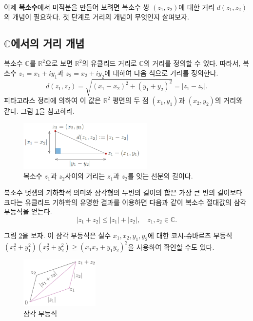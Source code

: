 이제 {\bf 복소수}에서 미적분을 만들어 보려면
복소수 쌍 $(z_1, z_2)$에 대한 거리 $d(z_1, z_2)$의 개념이 필요하다.
첫 단계로 거리의 개념이 무엇인지 살펴보자.

\subsection{$\mathbb C$에서의 거리 개념}

복소수 $\mathbb C$를 $\mathbb R^2$으로 보면 $\mathbb R^2$의 유클리드 거리로
$\mathbb C$의 거리를 정의할 수 있다.
따라서, 복소수 $z_1=x_1+iy_1$과 $z_2=x_2+iy_2$에 대하여 
다음 식으로 거리를 정의한다.
$$
d(z_1,z_2) = \sqrt{(x_1-x_2)^2 + (y_1+y_2)^2} = |z_1-z_2|.
$$
피타고라스 정리에 의하여 이 값은 $\mathbb R^2$ 평면의 두 점 $(x_1, y_1)$과 $(x_2, y_2)$의 거리와 같다.
그림 \ref{fig-1-10}을 참고하라.

\begin{figure}[!h]
\begin{center}
\includegraphics[width=0.6\textwidth]{./SaltChapter/figs/fig-1-10}
\end{center}
\caption{복소수 $z_1$과 $z_2$사이의 거리는 $z_1$과 $z_2$를 잇는 선분의 길이다.}
\label{fig-1-10}
\end{figure}

복소수 덧셈의 기하학적 의미와 
삼각형의 두변의 길이의 합은 가장 큰 변의 길이보다 크다는 
유클리드 기하학의 유명한 결과를 이용하면
다음과 같이 복소수 절대값의 삼각 부등식을 얻는다.
$$
|z_1+z_2| \le |z_1|  + |z_2|, \quad z_1, z_2\in\mathbb C.
$$

그림 \ref{fig-1-11}을 보자.
이 삼각 부등식은 실수 $x_1, x_2, y_1, y_2$에 대한 코시-슈바르츠 부등식
$(x_1^2+y_1^2) (x_2^2+y_2^2) \ge (x_1x_2 + y_1y_2)^2$을 사용하여
확인할 수도 있다.


\begin{figure}[!h]
\begin{center}
\includegraphics[width=0.35\textwidth]{./SaltChapter/figs/fig-1-11}
\end{center}
\caption{삼각 부등식}
\label{fig-1-11}
\end{figure}

